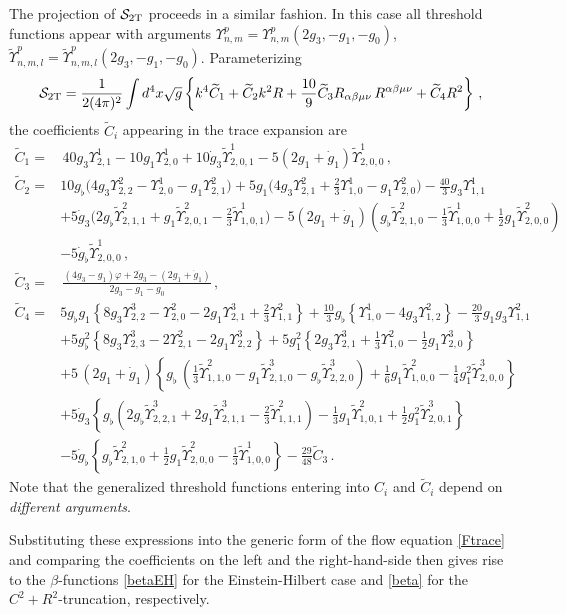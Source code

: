 \documentclass[preprint,preprintnumbers,amsmath,amssymb,nofootinbib,APS]{revtex4}
\newcommand{\be}{\begin{equation}}
\newcommand{\ee}{\end{equation}}
\newcommand{\cS}{\mathcal{S}}
\newcommand{\2}{\sqrt{2\,}}
\newcommand{\half}{\tfrac{1}{2}}
\newcommand{\dg}{{\dot{g}}}
\newcommand{\tU}{{\tilde{\Upsilon}}}
\newcommand{\tC}{{\widetilde{C}}}
\newcommand{\U}{\Upsilon}
\begin{document}
\begin{appendix}
The projection of $\cS_{\rm 2T}$ proceeds in a similar fashion. In this case all threshold functions appear with arguments
$\U^p_{n,m} = \U^p_{n,m}(2g_3,-g_1, -g_0)$, $\tU^p_{n,m,l} = \tU^p_{n,m,l}(2g_3,-g_1, -g_0)$. Parameterizing
%
\be\label{eq:TR2T}
\cS_{\rm 2T} = \frac{1}{2(4\pi)^2} \int d^4x \sqrt{g}
\left\{  k^4 \tC_1 + \tC_2 k^2 R + \frac{10}{9} \tC_3 R_{\alpha \beta\mu\nu} \, R^{\alpha \beta\mu\nu} + \tC_4 R^2 \right\} \, ,
\ee
%
the coefficients $\tC_i$ appearing in the trace expansion are
%
\be\label{tCcoeff}
\begin{split}
\tC_1 = & \, 40 g_3 \U^1_{2,1} - 10 g_1 \U^1_{2,0} + 10 \dg_3 \tU^1_{2,0,1} - 5 (2 g_1 + \dg_1) \tU^1_{2,0,0} \, , \\
%
\tC_2 = & 10 g_\flat \big( 4 g_3 \U^2_{2,2} -  \U^1_{2,0} -  g_1 \U^2_{2,1} \big)
 + 5 g_1 \big( 4 g_3 \U^2_{2,1} + \tfrac{2}{3} \U^1_{1,0} - g_1 \U^2_{2,0} \big) - \tfrac{40}{3} g_3 \U^1_{1,1} \\
& + 5 \dg_3 \big( 2 g_\flat \tU^2_{2,1,1} + g_1 \tU^2_{2,0,1} - \tfrac{2}{3} \tU^1_{1,0,1} \big) 
- 5 (2 g_1 + \dg_1) (g_\flat \tU^2_{2,1,0} - \tfrac{1}{3} \tU^1_{1,0,0} + \tfrac{1}{2} g_1 \tU^2_{2,0,0} )\\ & 
- 5\dg_\flat \tU^1_{2,0,0} \, , \\
%
\tC_3 = & \, \frac{(4 g_3 - g_1) \varphi + 2 \dg_3 - (2 g_1 + \dg_1)}{2 g_3 - g_1 - g_0} \, , \\
%
\tC_4 = & 5 g_\flat g_1 \left\{ 8 g_3\U^3_{2,2} - \U^2_{2,0} - 2 g_1 \U^3_{2,1} + \tfrac{2}{3} \U^2_{1,1} \right\} + \frac{10}{3} g_\flat \left\{ \U^1_{1,0} - 4 g_3 \U^2_{1,2} \right\} - \tfrac{20}{3} g_1 g_3 \U^2_{1,1} \\
& + 5 g_\flat^2 \left\{ 8 g_3 \U^3_{2,3} -2 \U^2_{2,1} - 2 g_1 \U^3_{2,2} \right\} 
+ 5 g_1^2 \left\{2 g_3 \U^3_{2,1} +\tfrac{1}{3} \U^2_{1,0} - \half g_1 \U^3_{2,0}   \right\} 
\\ 
& + 5 \, (2 g_1 + \dg_1) \left\{ g_\flat \, ( \tfrac{1}{3} \tU^2_{1,1,0} - g_1 \tU^3_{2,1,0} - g_\flat \tU^3_{2,2,0})  +   \tfrac{1}{6} g_1 \tU^2_{1,0,0} - \tfrac{1}{4} g_1^2 \tU^3_{2,0,0} \right\} \\
& + 5 \dg_3 \left\{ g_\flat ( 2 g_\flat \tU^3_{2,2,1} + 2 g_1 \tU^3_{2,1,1} - \tfrac{2}{3} \tU^2_{1,1,1}) - \tfrac{1}{3} g_1 \tU^2_{1,0,1} + \tfrac{1}{2} g_1^2 \tU^3_{2,0,1} \right\} \\
& - 5 \dg_\flat \left\{ g_\flat \tU^2_{2,1,0} + \half g_1 \tU^2_{2,0,0} - \tfrac{1}{3} \tU^1_{1,0,0} \right\}
- \tfrac{29}{48} \tC_3 \, .  
\end{split}
\ee
%
Note that the generalized threshold functions entering into $C_i$ and $\tC_i$ depend on {\it different arguments}. 

Substituting these expressions into the generic form of the flow equation \eqref{Ftrace} and comparing the coefficients on
the left and the right-hand-side then gives rise to the $\beta$-functions \eqref{betaEH} 
for the Einstein-Hilbert case and \eqref{beta} for the $C^2 + R^2$-truncation, respectively.




\end{appendix}
\end{document}
